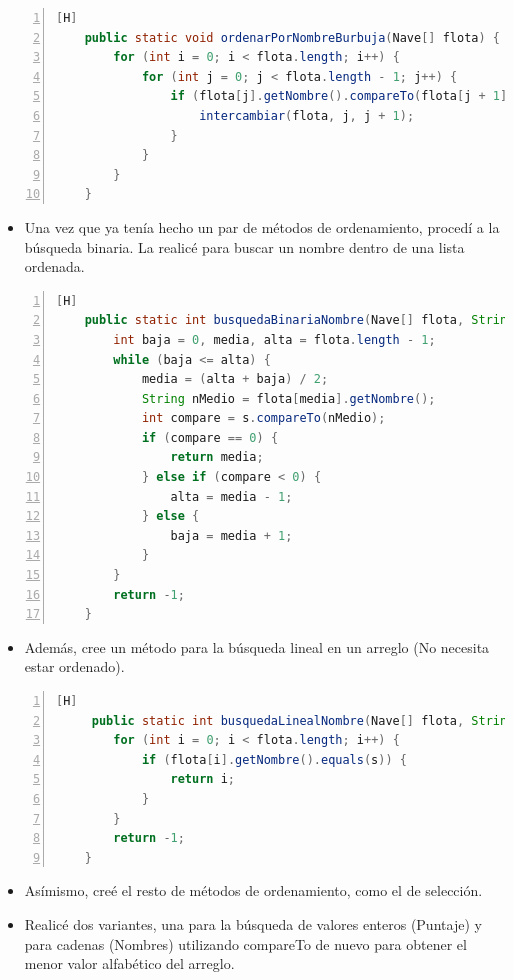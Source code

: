 \documentclass{article}
\begin{document}
	\begin{lstlisting}[language=java,caption={Ordenamiento por burbuja: Cadenas}, numbers=left][H]
	public static void ordenarPorNombreBurbuja(Nave[] flota) {
        for (int i = 0; i < flota.length; i++) {
            for (int j = 0; j < flota.length - 1; j++) {
                if (flota[j].getNombre().compareTo(flota[j + 1].getNombre()) > 0) {
                    intercambiar(flota, j, j + 1);
                }
            }
        }
    }
	\end{lstlisting}
	\begin{itemize}	
		\item Una vez que ya tenía hecho un par de métodos de ordenamiento, procedí a la búsqueda binaria. La realicé para buscar un nombre dentro de una lista ordenada.
	\end{itemize}
	\begin{lstlisting}[language=java,caption={Búsqueda binaria: Cadenas}, numbers=left][H]
	public static int busquedaBinariaNombre(Nave[] flota, String s) {
        int baja = 0, media, alta = flota.length - 1;
        while (baja <= alta) {
            media = (alta + baja) / 2;
            String nMedio = flota[media].getNombre();
            int compare = s.compareTo(nMedio);
            if (compare == 0) {
                return media;
            } else if (compare < 0) {
                alta = media - 1;
            } else {
                baja = media + 1;
            }
        }
        return -1;
    }
	\end{lstlisting}	
	\begin{itemize}	
		\item Además, cree un método para la búsqueda lineal en un arreglo (No necesita estar ordenado).
	\end{itemize}
	\begin{lstlisting}[language=java,caption={Método para obtener números desordenados}, numbers=left][H]
	 public static int busquedaLinealNombre(Nave[] flota, String s) {
        for (int i = 0; i < flota.length; i++) {
            if (flota[i].getNombre().equals(s)) {
                return i;
            }
        }
        return -1;
    }
	\end{lstlisting}
	\begin{itemize}	
		\item Asímismo, creé el resto de métodos de ordenamiento, como el de selección.
		\item Realicé dos variantes, una para la búsqueda de valores enteros (Puntaje) y para cadenas (Nombres) utilizando compareTo de nuevo para obtener el menor valor alfabético del arreglo.
	\end{itemize}
\end{document}
